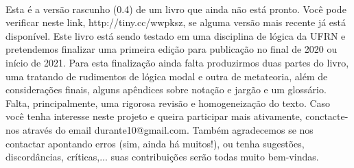 \thispagestyle{empty}
\onecolumn
\ 
\vfill

\parbox{3 in}{
Esta é a versão rascunho (0.4) de um livro que ainda não está pronto.
Você pode verificar neste link, \hbox{http://tiny.cc/wwpksz}, se alguma versão mais recente já está disponível.
Este livro está sendo testado em uma disciplina de lógica da UFRN e pretendemos finalizar uma primeira edição para publicação no final de 2020 ou início de 2021. 
Para esta finalização ainda falta produzirmos duas partes do livro, uma tratando de rudimentos de lógica modal e outra de metateoria, além de considerações finais, alguns apêndices sobre notação e jargão e um glossário.
Falta, principalmente, uma rigorosa revisão e homogeneização do texto.
Caso você tenha interesse neste projeto e queira participar mais ativamente, conctacte-nos através do email durante10@gmail.com. 
Também agradecemos se nos contactar apontando  erros (sim, ainda há muitos!), ou tenha sugestões, discordâncias, críticas,... suas contribuições serão todas muito bem-vindas.

}

\vfill

\parbox{3 in}{

}
\vfill
